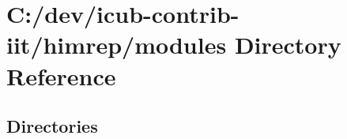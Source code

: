 \section{C\+:/dev/icub-\/contrib-\/iit/himrep/modules Directory Reference}
\label{dir_e05d7e2b1ecd646af5bb94391405f3b5}
\subsection*{Directories}
\begin{DoxyCompactItemize}
\end{DoxyCompactItemize}
